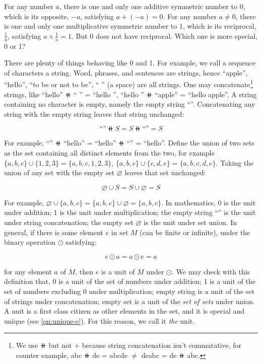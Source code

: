 \documentclass[b5paper]{article}
\begin{document}
For any number $a$, there is one and only one additive symmetric number to 0, which is its opposite, $-a$, satisfying $a + (-a) = 0$. For any number $a \ne 0$, there is one and only one multiplicative symmetric number to 1, which is its reciprocal, $\frac{1}{a}$, satisfying $a \times \frac{1}{a} = 1$. But 0 does not have reciprocal. Which one is more special, 0 or 1?

There are plenty of things behaving like 0 and 1. For example, we call a sequence of characters a string. Word, phrases, and sentences are strings, hence ``apple'', ``hello'', ``to be or not to be'', `` '' (a space) are all strings. One may concatenate\footnote{We use $\doubleplus$ but not $+$ because string concatenation isn't commutative, for counter example, abc $\doubleplus$ de = abcde $\ne$ deabc = de $\doubleplus$ abc.} strings, like ``hello'' $\doubleplus$ `` '' = ``hello '', ``hello '' $\doubleplus$ ``apple'' = ``hello apple''. A string containing no character is empty, namely the empty string ``''. Concatenating any string with the empty string leaves that string unchanged:

\[
\text{``''} \doubleplus S = S \doubleplus \text{``''} = S
\]

For example, ``'' $\doubleplus$ ``hello'' = ``hello'' $\doubleplus$ ``'' = ``hello''. Define the union of two sets as the set containing all distinct elements from the two, for example $\{a, b, c\} \cup \{1, 2, 3\} = \{a, b, c, 1, 2, 3\}$, $\{a, b, c\} \cup \{c, d, e\} = \{a, b, c, d, e\}$. Taking the union of any set with the empty set $\varnothing$ leaves that set unchanged:

\[
\varnothing \cup S = S \cup \varnothing = S
\]

For example, $\varnothing \cup \{a, b, c\} = \{a, b, c\} \cup \varnothing = \{a, b, c\}$. In mathematics, 0 is the unit under addition; 1 is the unit under multiplication; the empty string ``'' is the unit under string concatenation; the empty set $\varnothing$ is the unit under set union. In general, if there is some element $e$ in set $M$ (can be finite or infinite), under the binary operation $\odot$ satisfying:

\[
  e \odot a = a \odot e = a
\]

for any element $a$ of $M$, then $e$ is a unit of $M$ under $\odot$. We may check with this definition that, 0 is a unit of the set of numbers under addition; 1 is a unit of the set of numbers excluding 0 under multiplication; empty string is a unit of the set of strings under concatenation; empty set is a unit of the \emph{set of sets} under union. A unit is a first class citizen as other elements in the set, and it is special and unique (see \cref{qn:unique-e}). For this reason, we call it {\em the} unit.
\end{document}
